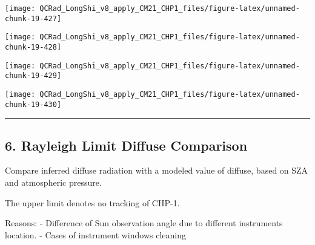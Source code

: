 \documentclass[
  10pt,
  a4paper,oneside]{article}
\begin{document}
\begin{center}\texttt{[image: QCRad\_LongShi\_v8\_apply\_CM21\_CHP1\_files/figure-latex/unnamed-chunk-19-427]} \end{center}

\begin{center}\texttt{[image: QCRad\_LongShi\_v8\_apply\_CM21\_CHP1\_files/figure-latex/unnamed-chunk-19-428]} \end{center}

\begin{center}\texttt{[image: QCRad\_LongShi\_v8\_apply\_CM21\_CHP1\_files/figure-latex/unnamed-chunk-19-429]} \end{center}

\begin{center}\texttt{[image: QCRad\_LongShi\_v8\_apply\_CM21\_CHP1\_files/figure-latex/unnamed-chunk-19-430]} \end{center}

\begin{center}\rule{0.5\linewidth}{0.5pt}\end{center}

\newpage

\hypertarget{rayleigh-limit-diffuse-comparison}{%
\subsection{6. Rayleigh Limit Diffuse Comparison}\label{rayleigh-limit-diffuse-comparison}}

Compare inferred diffuse radiation with a modeled value of diffuse,
based on SZA and atmospheric pressure.

The upper limit denotes no tracking of CHP-1.

Reasons:
- Difference of Sun observation angle due to different instruments location.
- Cases of instrument windows cleaning
\end{document}
